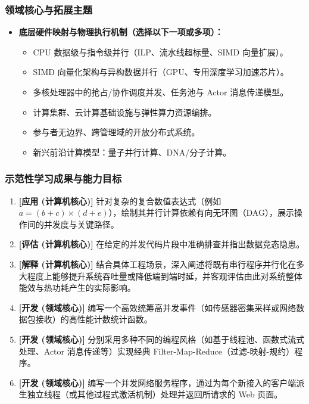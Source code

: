 \subsubsection{领域核心与拓展主题}
\begin{itemize}
    \item \textbf{底层硬件映射与物理执行机制（选择以下一项或多项）：}
    \begin{itemize}
        \item CPU 数据级与指令级并行（ILP、流水线超标量、SIMD 向量扩展）。
        \item SIMD 向量化架构与异构数据并行（GPU、专用深度学习加速芯片）。
        \item 多核处理器中的抢占/协作调度并发、任务池与 Actor 消息传递模型。
        \item 计算集群、云计算基础设施与弹性算力资源编排。
        \item 参与者无边界、跨管理域的开放分布式系统。
        \item 新兴前沿计算模型：量子并行计算、DNA/分子计算。
    \end{itemize}
\end{itemize}

\subsubsection{示范性学习成果与能力目标}
\begin{enumerate}
    \item \textbf{[应用 (计算机核心)]} 针对复杂的复合数值表达式（例如 $a = (b + c) \times (d + e)$），绘制其并行计算依赖有向无环图（DAG），展示操作间的并发度与关键路径。
    \item \textbf{[评估 (计算机核心)]} 在给定的并发代码片段中准确排查并指出数据竞态隐患。
    \item \textbf{[解释 (计算机核心)]} 结合具体工程场景，深入阐述将既有串行程序并行化在多大程度上能够提升系统吞吐量或降低端到端时延，并客观评估由此对系统整体能效与热功耗产生的实际影响。
    \item \textbf{[开发 (领域核心)]} 编写一个高效统筹高并发事件（如传感器密集采样或网络数据包接收）的高性能计数统计函数。
    \item \textbf{[开发 (领域核心)]} 分别采用多种不同的编程风格（如基于线程池、函数式流式处理、Actor 消息传递等）实现经典 Filter-Map-Reduce（过滤-映射-规约）程序。
    \item \textbf{[开发 (领域核心)]} 编写一个并发网络服务程序，通过为每个新接入的客户端派生独立线程（或其他过程式激活机制）处理并返回所请求的 Web 页面。
\end{enumerate}

